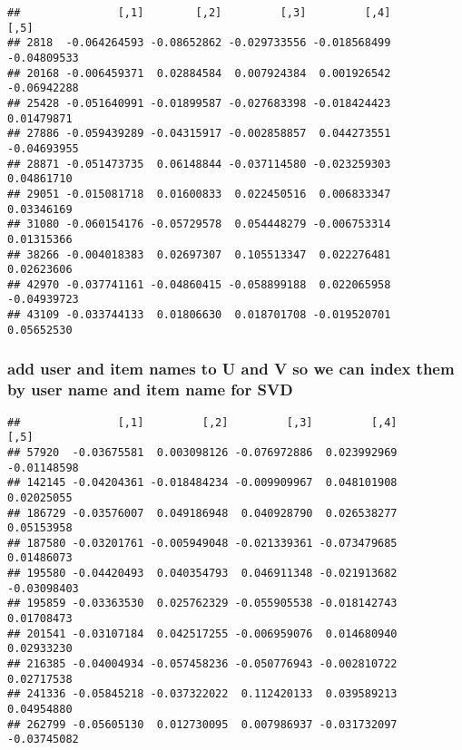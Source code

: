 \documentclass[]{article}
\newenvironment{Shaded}{\begin{snugshade}}{\end{snugshade}}
\newcommand{\DecValTok}[1]{\textcolor[rgb]{0.00,0.00,0.81}{#1}}
\newcommand{\KeywordTok}[1]{\textcolor[rgb]{0.13,0.29,0.53}{\textbf{#1}}}
\newcommand{\NormalTok}[1]{#1}
\newcommand{\OperatorTok}[1]{\textcolor[rgb]{0.81,0.36,0.00}{\textbf{#1}}}
\newcommand{\StringTok}[1]{\textcolor[rgb]{0.31,0.60,0.02}{#1}}
\begin{document}
\begin{verbatim}
##               [,1]        [,2]         [,3]         [,4]        [,5]
## 2818  -0.064264593 -0.08652862 -0.029733556 -0.018568499 -0.04809533
## 20168 -0.006459371  0.02884584  0.007924384  0.001926542 -0.06942288
## 25428 -0.051640991 -0.01899587 -0.027683398 -0.018424423  0.01479871
## 27886 -0.059439289 -0.04315917 -0.002858857  0.044273551 -0.04693955
## 28871 -0.051473735  0.06148844 -0.037114580 -0.023259303  0.04861710
## 29051 -0.015081718  0.01600833  0.022450516  0.006833347  0.03346169
## 31080 -0.060154176 -0.05729578  0.054448279 -0.006753314  0.01315366
## 38266 -0.004018383  0.02697307  0.105513347  0.022276481  0.02623606
## 42970 -0.037741161 -0.04860415 -0.058899188  0.022065958 -0.04939723
## 43109 -0.033744133  0.01806630  0.018701708 -0.019520701  0.05652530
\end{verbatim}

\hypertarget{add-user-and-item-names-to-u-and-v-so-we-can-index-them-by-user-name-and-item-name-for-svd}{%
\subsubsection{add user and item names to U and V so we can index them
by user name and item name for
SVD}\label{add-user-and-item-names-to-u-and-v-so-we-can-index-them-by-user-name-and-item-name-for-svd}}

\begin{Shaded}
\end{Shaded}

\begin{verbatim}
##               [,1]         [,2]         [,3]         [,4]        [,5]
## 57920  -0.03675581  0.003098126 -0.076972886  0.023992969 -0.01148598
## 142145 -0.04204361 -0.018484234 -0.009909967  0.048101908  0.02025055
## 186729 -0.03576007  0.049186948  0.040928790  0.026538277  0.05153958
## 187580 -0.03201761 -0.005949048 -0.021339361 -0.073479685  0.01486073
## 195580 -0.04420493  0.040354793  0.046911348 -0.021913682 -0.03098403
## 195859 -0.03363530  0.025762329 -0.055905538 -0.018142743  0.01708473
## 201541 -0.03107184  0.042517255 -0.006959076  0.014680940  0.02933230
## 216385 -0.04004934 -0.057458236 -0.050776943 -0.002810722  0.02717538
## 241336 -0.05845218 -0.037322022  0.112420133  0.039589213  0.04954880
## 262799 -0.05605130  0.012730095  0.007986937 -0.031732097 -0.03745082
\end{verbatim}
\end{document}
